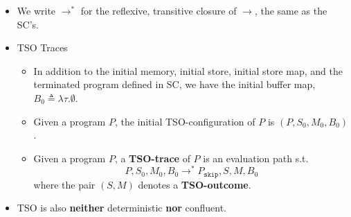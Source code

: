 \documentclass[twocolumn,landscape,10pt]{article}
\theoremstyle{definition}
\begin{document}
\begin{itemize}
    \item We write $\rightarrow^{*}$ for the reflexive, transitive closure of
        $\rightarrow$, the same as the SC's.
    \item TSO Traces
        \begin{itemize}
            \item In addition to the initial memory, initial store, initial
                store map, and the terminated program defined in SC, we have the
                initial buffer map, $B_0\triangleq\lambda\tau.\emptyset$.
            \item Given a program $P$, the initial TSO-configuration of $P$ is
                $(P,S_0,M_0,B_0)$.
            \item Given a program $P$, a \textbf{TSO-trace} of $P$ is an
                evaluation path s.t.
                \[
                    P,S_0,M_0,B_0\rightarrow^* P_\texttt{skip},S,M,B_0
                \]
                where the pair $(S,M)$ denotes a \textbf{TSO-outcome}.
        \end{itemize} 
    \item TSO is also \textbf{neither} deterministic \textbf{nor} confluent.
\end{itemize}
\end{document}
